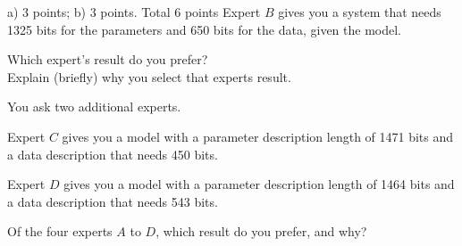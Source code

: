 \documentclass[a4paper]{article}
\newcommand{\tjboxed}[1]{}
\begin{document}
\begin{exam}
\begin{vraag}{a) 3 points; b) 3 points. Total 6 points}
Expert $B$ gives you a system that needs 1325 bits for the parameters and 650 bits for
the data, given the model.
\begin{deelvraag}
  Which expert's result do you prefer?\\
  Explain (briefly) why you select that experts result.
  \tjboxed{%
    The total description length of $A$'s result is $1537+438=1975$ bits.
    For expert $B$ the total description length is $1325+650=1975$ bits. So both experts
    achieve the same complexity. In accordance with Occam's razor I prefer expert
    $B$'s explanation because his/her model is less complex.
  }
\end{deelvraag}
\begin{deelvraag}
  You ask two additional experts.

  Expert $C$ gives you a model with a parameter description length of 1471 bits
  and a data description that needs 450 bits.

  Expert $D$ gives you a model with a parameter description length of 1464 bits
  and a data description that needs 543 bits.

  Of the four experts $A$ to $D$, which result do you prefer, and why?
  \tjboxed{%
    The total complexity for expert $C$ is $1471+450=1921$ bits and for
    expert $D$ it is $1464+543=2007$ bits. Expert $D$ explanation is more
    complex than any of the three others
    so I reject it in accordance with the MDL principle. For the same
    reason I prefer expert $C$'s explanation, because it has the smallest overall
    complexity although the model complexity is larger than for expert $B$.
  }
\end{deelvraag}
\end{vraag}




\end{exam}
\end{document}
